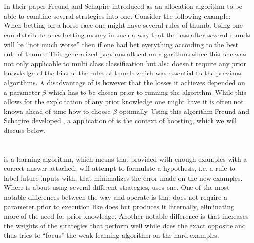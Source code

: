 \section{\hedge}
In their paper Freund and Schapire introduced \hedge as an allocation algorithm to be able to combine several strategies into one. Consider the following example: When betting on a horse race one might have several rules of thumb. Using \hedge one can distribute ones betting money in such a way that the loss after several rounds will be ``not much worse'' then if one had bet everything according to the best rule of thumb. This generalized previous allocation algorithms since this one was not only applicable to multi class classification but also doesn't require any prior knowledge of the bias of the rules of thumb which was essential to the previous algorithms. A disadvantage of \hedge is however that the losses it achieves depended on a parameter $\beta$ which has to be chosen prior to running the algorithm. While this allows for the exploitation of any prior knowledge one might have it is often not known ahead of time how to choose $\beta$ optimally. Using this \hedge algorithm Freund and Schapire developed \adaB, a application of \hedge is the context of boosting, which we will discuss below. 

\section{\adaB}
\adaB is a learning algorithm, which means that provided with enough examples with a correct answer attached, \adaB will attempt to formulate a hypothesis, i.e. a rule to label future inputs with, that minimalizes the error made on the new examples. Where \hedge is about using several different strategies, \adaB uses one. One of the most notable differences between the way \hedge and \adaB operate is that \adaB does not require a parameter prior to execution like \hedge does but produces it internally, eliminating more of the need for prior knowledge. Another notable difference is that \hedge increases the weights of the strategies that perform well while \adaB does the exact opposite and thus tries to ``focus'' the weak learning algorithm on the hard examples. 
